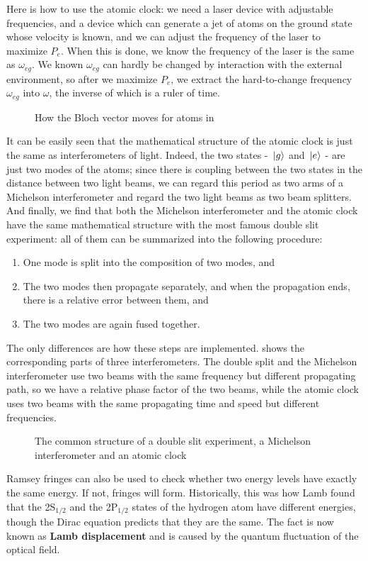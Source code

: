 \documentclass[hyperref, a4paper]{article}
\newcommand*{\concept}[1]{{\textbf{#1}}}
\begin{document}
Here is how to use the atomic clock: we need a laser device with adjustable frequencies, and a device which 
can generate a jet of atoms on the ground state whose velocity is known, and we can adjust the frequency 
of the laser to maximize $P_e$. When this is done, we know the frequency of the laser is the same as $\omega_{eg}$.
We known $\omega_{eg}$ can hardly be changed by interaction with the external environment, so after we maximize 
$P_e$, we extract the hard-to-change frequency $\omega_{eg}$ into $\omega$, the inverse of which is a ruler of time.

\begin{figure}
    \centering
    
    \caption{How the Bloch vector moves for atoms in }
    \label{fig:bloch-vector}
\end{figure}

It can be easily seen that the mathematical structure of the atomic clock is just the same as interferometers
of light. Indeed, the two states - $\ket*{g}$ and $\ket*{e}$ - are just two modes of the atoms; since there is 
coupling between the two states in the distance between two light beams, we can regard this period as two 
arms of a Michelson interferometer and regard the two light beams as two beam splitters. And finally, we find 
that both the Michelson interferometer and the atomic clock have the same mathematical structure with 
the most famous double slit experiment: all of them can be summarized into the following procedure:
\begin{enumerate}
    \item One mode is split into the composition of two modes, and
    \item The two modes then propagate separately, and when the propagation ends, there is a relative error between them, and
    \item The two modes are again fused together. 
\end{enumerate}
The only differences are how these steps are implemented.  shows the corresponding 
parts of three interferometers. The double split and the Michelson interferometer use two beams with the same 
frequency but different propagating path, so we have a relative phase factor of the two beams, while the atomic
clock uses two beams with the same propagating time and speed but different frequencies.

\begin{figure}
    \centering
    
    \caption{The common structure of a double slit experiment, a Michelson interferometer and an atomic clock}
    \label{fig:same-structure}
\end{figure}

Ramsey fringes can also be used to check whether two energy levels have exactly the same energy. 
If not, fringes will form. Historically, this was how Lamb found that the 2S$_{1/2}$ and the 2P$_{1/2}$
states of the hydrogen atom have different energies, though the Dirac equation predicts that they are the same.
The fact is now known as \concept{Lamb displacement} and is caused by the quantum fluctuation of the 
optical field.
\end{document}
